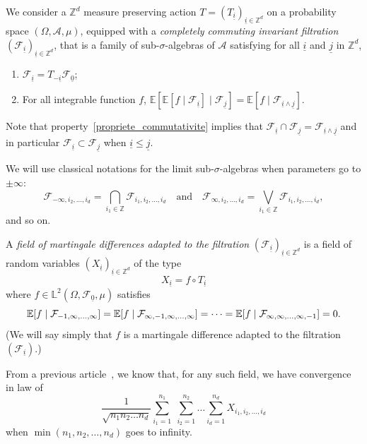 \documentclass[10pt]{amsart}
\theoremstyle{definition}\newtheorem{defi}[theo]{Definition}\newtheorem{rema}[theo]{Remark}\newtheorem{exam}[theo]{Example}\newtheorem{exem}[theo]{Example}\newtheorem{nota}[theo]{Notation}
\newcommand{\Z}{\mathbb{Z}}
\newcommand*\bbL{\mathbb{L}}
\newcommand{\bbE}{\mathbb{E}}
\newcommand{\E}[1]{\bbE\left[#1\right]}
\newcommand*\A{\mathcal{A}}
\newcommand*\F{\mathcal{F}}
\let\originalleft\left
\let\originalright\right
\renewcommand{\left}{\mathopen{}\mathclose\bgroup\originalleft}
\renewcommand{\right}{\aftergroup\egroup\originalright}
\begin{document}
We consider a $\Z^d$ measure preserving action $T=(T_{\underline{i}})_{\underline{i}\in\Z^d}$ on a probability space $(\Omega,\A,\mu)$, equipped with a \emph{completely commuting invariant filtration} $(\F_{\underline{i}})_{\underline{i}\in\Z^d}$, that is a family of sub-$\sigma$-algebras of $\A$ satisfying for all $\underline{i}$ and $\underline{j}$ in $\Z^d$,
\begin{enumerate}
\item \label{propriete_invariante}
$\F_{\underline{i}}=T_{-\underline{i}}\F_{\underline{0}}$;
\item\label{propriete_commutativite}
For all integrable function $f$, $\bbE[\bbE[f\mid\F_{\underline{i}}]\mid\F_{\underline{j}}]=\bbE[f\mid\F_{\underline{i}\wedge\underline{j}}]$.
\end{enumerate}
Note that property~\eqref{propriete_commutativite} implies that $\F_{\underline{i}}\cap\F_{\underline{j}}=\F_{\underline{i}\wedge\underline{j}}$ and in particular $\F_{\underline{i}}\subset\F_{\underline{j}}$ when $\underline{i}\leq \underline{j}$.

We will use classical notations for the limit sub-$\sigma$-algebras when parameters go to $\pm\infty$:
\[
\F_{-\infty,i_2,\dots,i_d}=\bigcap_{i_1\in\Z}\F_{i_1,i_2,\dots,i_d}\quad\text{and}\quad\F_{\infty,i_2,\dots,i_d}=\bigvee_{i_1\in\Z}\F_{i_1,i_2,\dots,i_d},
\]
and so on.

A \emph{field of martingale differences adapted to the filtration} $(\F_{\underline{i}})_{\underline{i}\in\Z^d}$ is a field of random variables $(X_{\underline{i}})_{\underline{i}\in\Z^d}$ of the type
\[
X_{\underline{i}}=f\circ T_{\underline{i}}
\]
where $f\in \bbL^2(\Omega,\F_{\underline{0}},\mu)$ satisfies
\begin{equation}\label{eq:cond-mart}
\E{f\mid\F_{-1,\infty,\dots,\infty}}=\E{f\mid\F_{\infty,-1,\infty,\dots,\infty}}=\dots=\E{f\mid\F_{\infty,\infty,\dots,\infty,-1}}=0.
\end{equation}
(We will say simply that $f$ is a martingale difference adapted to the filtration $(\F_{\underline{i}})$.)

From a previous article~\cite{MR3913270}, we know that, for any such field, we have convergence in law of
\begin{equation}\label{eq:sommes_partielles_normalisees}
\frac1{\sqrt{n_1n_2\dots n_d}}\sum_{i_1=1}^{n_1}\;\sum_{i_2=1}^{n_2}\dots\sum_{i_d=1}^{n_d} X_{i_1,i_2,\dots,i_d}
\end{equation}
when $\min(n_1,n_2,\dots,n_d)$ goes to infinity.
\end{document}
